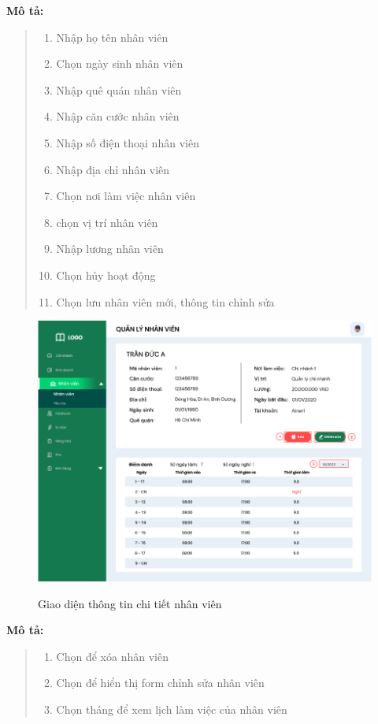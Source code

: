             \textbf{Mô tả:}  
            \begin{quote}
                \begin{enumerate}
                    \item Nhập họ tên nhân viên
                    \item Chọn ngày sinh nhân viên
                    \item Nhập quê quán nhân viên
                    \item Nhập căn cước nhân viên
                    \item Nhập số điện thoại nhân viên
                    \item Nhập địa chỉ nhân viên
                    \item Chọn nơi làm việc nhân viên
                    \item chọn vị trí nhân viên
                    \item Nhập lương nhân viên
                    \item Chọn hủy hoạt động
                    \item Chọn lưu nhân viên mới, thông tin chỉnh sửa 
                \end{enumerate}
            \end{quote}
            \begin{figure}[!htp]
                \centering
                \includegraphics[width=12cm]{img/UI/admin/staff_detail.png}
                \label{25}
                \newline
                \caption{Giao diện thông tin chi tiết nhân viên}
            \end{figure}
            \textbf{Mô tả:}  
            \begin{quote}
                \begin{enumerate}
                    \item Chọn để xóa nhân viên
                    \item Chọn để hiển thị form chỉnh sửa nhân viên
                    \item Chọn tháng để xem lịch làm việc của nhân viên
                    
                \end{enumerate}
            \end{quote}
        \newpage


